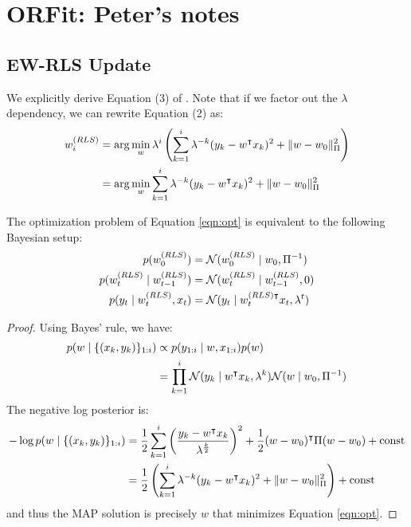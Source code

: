 \section{ORFit: Peter's notes}

\newcommand{\B}{\vB}
\newcommand{\D}{\vD}
\newcommand{\F}{\vF}
\newcommand{\HH}{\vH}
\newcommand{\K}{\vK}
\newcommand{\Q}{\vQ}
\newcommand{\R}{\vR}
\newcommand{\normal}{\gauss}

\newtheorem{corollary}{Corollary}[theorem]

\subsection{EW-RLS Update}

We explicitly derive Equation (3) of \cite{ORFit}. Note that if we factor out the $\lambda$ dependency,
we can rewrite Equation (2) as:
\begin{align}
    w_i^{(RLS)} &= \arg\min_{w} \lambda^{i} \left( 
    \sum_{k=1}^{i} \lambda^{-k} (y_k - w^{\intercal} x_k)^2 + \| w - w_0 \|_{\Pi}^{2}
    \right) \\
    &= \arg\min_{w}
    \sum_{k=1}^{i} \lambda^{-k} (y_k - w^{\intercal} x_k)^2 + \| w - w_0 \|_{\Pi}^{2}
    \label{eqn:opt}
\end{align}

\begin{lemma}
\label{lemma:1}
    The optimization problem of Equation \ref{eqn:opt} is equivalent to
    the following Bayesian setup:
    \begin{align}
        p(w_0^{(RLS)}) &= \normal(w_0^{(RLS)} \mid w_0, \Pi^{-1}) \\
        p(w_t^{(RLS)} \mid w_{t-1}^{(RLS)}) &= \normal(w_t^{(RLS)} \mid w_{t-1}^{(RLS)}, 0) \\
        p(y_t \mid w_t^{(RLS)}, x_t) &= \normal(y_t \mid w_t^{(RLS)\T}x_t, \lambda^{t}) \label{eqn:bayes_emission}
    \end{align}
\end{lemma}

\begin{proof}
    Using Bayes' rule, we have:
    \begin{align}
        p(w \mid \{(x_k, y_k)\}_{1:i}) &\propto p(y_{1:i} \mid w, x_{1:i}) p(w) \\
        &= \prod_{k=1}^{i} \normal(y_k \mid w^{\T}x_k, \lambda^{k}) \normal(w \mid w_0, \Pi^{-1})
    \end{align}
    The negative log posterior is:
    \begin{align}
        -\log{p(w \mid \{(x_k, y_k)\}_{1:i})} &= \frac{1}{2} \sum_{k=1}^{i} \left( \frac{y_k - w^{\intercal} x_k}{\lambda^{\frac{k}{2}}} \right)^{2} + \frac{1}{2} (w - w_0)^{\intercal} \Pi (w - w_0) + \text{const} \\
        &= \frac{1}{2} \left( \sum_{k=1}^{i} \lambda^{-k} (y_k - w^{\intercal} x_k)^2 + \| w - w_0 \|_{\Pi}^{2} \right)
        + \text{const}
    \end{align}
    and thus the MAP solution is precisely $w$ that minimizes Equation \ref{eqn:opt}.
\end{proof}

